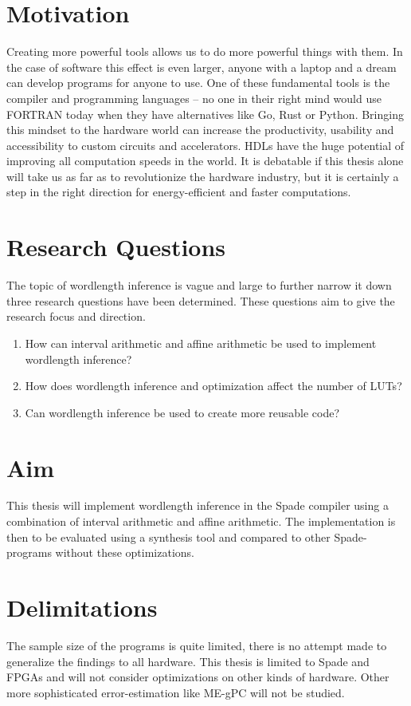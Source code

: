 \section{Motivation}
Creating more powerful tools allows us to do more powerful things with them. In the case of software this effect is even larger, anyone with a laptop and a dream can develop programs for anyone to use. One of these fundamental tools is the compiler and programming languages -- no one in their right mind would use FORTRAN today when they have alternatives like Go, Rust or Python. Bringing this mindset to the hardware world can increase the productivity, usability and accessibility to custom circuits and accelerators. HDLs have the huge potential of improving all computation speeds in the world. It is debatable if this thesis alone will take us as far as to revolutionize the hardware industry, but it is certainly a step in the right direction for energy-efficient and faster computations.

\section{Research Questions}
\label{secResearchQuestions}
The topic of wordlength inference is vague and large to further narrow it down three research questions have been determined. These questions aim to give the research focus and direction.

\begin{enumerate}
  \item How can interval arithmetic and affine arithmetic be used to implement wordlength inference?
  \item How does wordlength inference and optimization affect the number of LUTs?
  \item Can wordlength inference be used to create more reusable code?
\end{enumerate}

\section{Aim}
This thesis will implement wordlength inference in the Spade compiler using a combination of interval arithmetic and affine arithmetic. The implementation is then to be evaluated using a synthesis tool and compared to other Spade-programs without these optimizations.

\section{Delimitations}
The sample size of the programs is quite limited, there is no attempt made to generalize the findings to all hardware. This thesis is limited to Spade and FPGAs and will not consider optimizations on other kinds of hardware. Other more sophisticated error-estimation like ME-gPC \cite{could} will not be studied.
